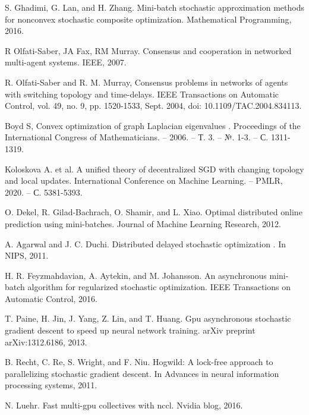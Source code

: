 \documentclass[a4paper,article,14pt]{extarticle}
\begin{document}
\begin{thebibliography}{1}
 S. Ghadimi, G. Lan, and H. Zhang. \flqq Mini-batch stochastic approximation methods for nonconvex stochastic composite optimization\frqq. Mathematical Programming, 2016.

 R Olfati-Saber, JA Fax, RM Murray. \flqq Consensus and cooperation in networked multi-agent systems\frqq. IEEE, 2007.

 R. Olfati-Saber and R. M. Murray, \flqq Consensus problems in networks of agents with switching topology and time-delays\frqq. IEEE Transactions on Automatic Control, vol. 49, no. 9, pp. 1520-1533, Sept. 2004, doi: 10.1109/TAC.2004.834113.

 Boyd S, \flqq Convex optimization of graph Laplacian eigenvalues \frqq. Proceedings of the International Congress of Mathematicians. – 2006. – Т. 3. – №. 1-3. – С. 1311-1319.

 Koloskova A. et al. \flqq A unified theory of decentralized SGD with changing topology and local updates\frqq. International Conference on Machine Learning. – PMLR, 2020. – С. 5381-5393.

 O. Dekel, R. Gilad-Bachrach, O. Shamir, and L. Xiao. \flqq Optimal distributed online prediction using mini-batches\frqq. Journal of Machine Learning Research, 2012.

 A. Agarwal and J. C. Duchi. \flqq Distributed delayed stochastic optimization \frqq. In NIPS, 2011.

 H. R. Feyzmahdavian, A. Aytekin, and M. Johansson. \flqq An asynchronous mini-batch algorithm for regularized stochastic optimization\frqq. IEEE Transactions on Automatic Control, 2016.

 T. Paine, H. Jin, J. Yang, Z. Lin, and T. Huang. \flqq Gpu asynchronous stochastic gradient descent to speed up neural network training\frqq. arXiv preprint arXiv:1312.6186, 2013.

 B. Recht, C. Re, S. Wright, and F. Niu. Hogwild: \flqq A lock-free approach to parallelizing stochastic gradient descent\frqq. In Advances in neural information processing systems, 2011.

  N. Luehr. \flqq Fast multi-gpu collectives with nccl\frqq. Nvidia blog, 2016.


\end{thebibliography}
\end{document}
